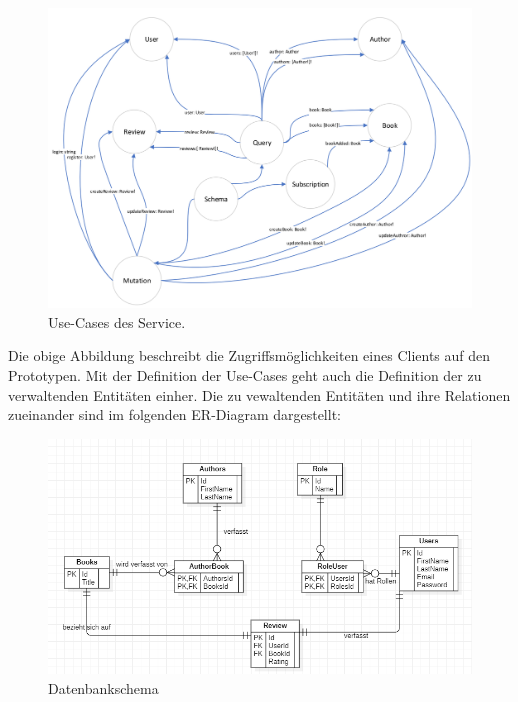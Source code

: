 \begin{figure}[H]
    \includegraphics[width=\textwidth]{pics/graph_usecases.png}
    \caption{Use-Cases des Service.}
\end{figure}

Die obige Abbildung beschreibt die Zugriffsmöglichkeiten eines Clients auf den Prototypen.
Mit der Definition der Use-Cases geht auch die Definition der zu verwaltenden Entitäten einher.
Die zu vewaltenden Entitäten und ihre Relationen zueinander sind im folgenden ER-Diagram dargestellt:


\begin{figure}[H]
    \includegraphics[width=\textwidth]{pics/ER-Diagram.png}
    \caption{Datenbankschema}
\end{figure}

